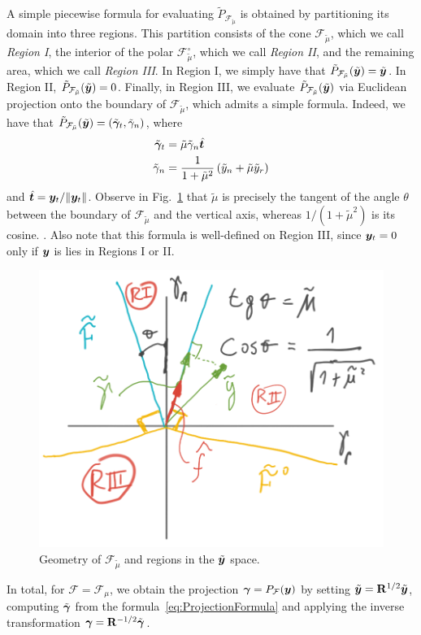A simple piecewise formula for evaluating $\tilde{P}_\mathcal{F_{\tilde\mu}}$ 
is obtained by partitioning its domain  into three regions.
This partition consists of the cone $\mathcal{F}_{\tilde\mu}$, which we call \textit{Region I},
the interior of the polar $\mathcal{F}_{\tilde\mu}^\circ$, which we call \textit{Region II},
and the remaining area, which we call \textit{Region III}.
In Region I, we simply have that $\tilde P_\mathcal{F_{\tilde\mu}}(\tilde{{\bm{y}}}) = \tilde{{\bm{y}}}$.
In Region II, $\tilde P_\mathcal{F_{\tilde\mu}}(\tilde{{\bm{y}}}) = 0$.
Finally, in Region III, we evaluate $\tilde P_\mathcal{F_{\tilde\mu}}(\tilde{{\bm{y}}})$
via Euclidean projection onto the boundary of $\mathcal{F}_{\tilde\mu}$,
which admits a simple formula. 
Indeed, we have that 
$\tilde P_\mathcal{F_{\tilde\mu}}(\tilde{{\bm{y}}}) = (\tilde{{\bm\gamma}}_t, \tilde{\gamma}_n)$,
where
\begin{align}\label{eq:ProjectionFormula}
\begin{aligned}
  \tilde{\bgamma}_t       &= \tilde{\mu}\tilde{\gamma}_n\hat{\vf{t}}\\
        \tilde{\gamma}_n  &= \frac{1}{1+\tilde{\mu}^2}\left(\tilde{y}_n +
	\tilde{\mu}\tilde{y}_r\right)
\end{aligned}
\end{align}
and $\hat{{\bm{t}}}={\bm{y}}_t/\Vert{\bm{y}}_t\Vert$. 
Observe in Fig.~\ref{fig:cone_regions} that  $\tilde\mu$ is precisely the tangent of the angle $\theta$ between the boundary 
of $\mathcal{F}_{\tilde\mu}$ and the vertical axis,
whereas $1/(1+\tilde\mu^2)$ is its cosine. . Also
note that this formula is well-defined on Region III,
since ${\bm{y}}_t = 0$ only if ${\bm{y}}$ is
lies in Regions I or II.




\begin{figure}[!h]
    \centering
    \includegraphics[width=0.45\columnwidth]{figures/cone_regions.png}
    \caption{Geometry of $\mathcal{F}_{\tilde\mu}$ and regions in the
    $\tilde{{\bm{y}}}$ space.}
    \label{fig:cone_regions}
\end{figure}
In total, for $\mathcal{F} = \mathcal{F}_{\mu}$, we obtain the projection ${\bm\gamma} = P_\mathcal{F}({\bm{y}})$  by setting 
$\tilde{{\bm{y}}} = {\mathbf{R}}^{1/2} \tilde{{\bm{y}}}$, computing $\tilde{{\bm\gamma}}$ from
the formula~\eqref{eq:ProjectionFormula} and applying the inverse transformation ${\bm\gamma}={\mathbf{R}}^{-1/2}\tilde{{\bm\gamma}}$.

